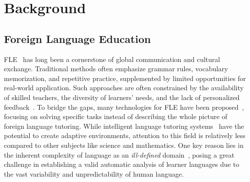 

\section{Background}\label{sec:background}
\subsection{Foreign Language Education}
FLE~\cite{watzke2003lasting,rashov2024modern} has long been a cornerstone of global communication and cultural exchange. Traditional methods often emphasize grammar rules, vocabulary memorization, and repetitive practice, supplemented by limited opportunities for real-world application. Such approaches are often constrained by the availability of skilled teachers, the diversity of learners' needs, and the lack of personalized feedback~\cite{williams2004learners}. To bridge the gaps, many technologies for FLE have been proposed~\cite{alhusaiyan2024systematic}, focusing on solving specific tasks instead of describing the whole picture of foreign language tutoring. While intelligent language tutoring systems~\cite{schwind1990intelligent,c1993towards} have the potential to create adaptive environments, attention to this field is relatively less compared to other subjects like science and mathematics. One key reason lies in the inherent complexity of language as an \textit{ill-defined} domain~\cite{schmidt2022artificial}, posing a great challenge in establishing a valid automatic analysis of learner languages due to the vast variability and unpredictability of human language.





